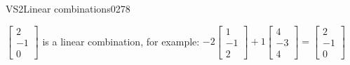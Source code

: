 \begin{exercise}{VS2}{Linear combinations}{0278}
\begin{exerciseAnswer}
\begin{itemize}
 \(\left[\begin{array}{c}
2 \\
-1 \\
0
\end{array}\right]\) is a linear combination, for example: \(
-2 \left[\begin{array}{c}
1 \\
-1 \\
2
\end{array}\right] + 1 \left[\begin{array}{c}
4 \\
-3 \\
4
\end{array}\right] = \left[\begin{array}{c}
2 \\
-1 \\
0
\end{array}\right]
                            \) 

 
\end{itemize}

     \end{exerciseAnswer}
 \end{exercise}



